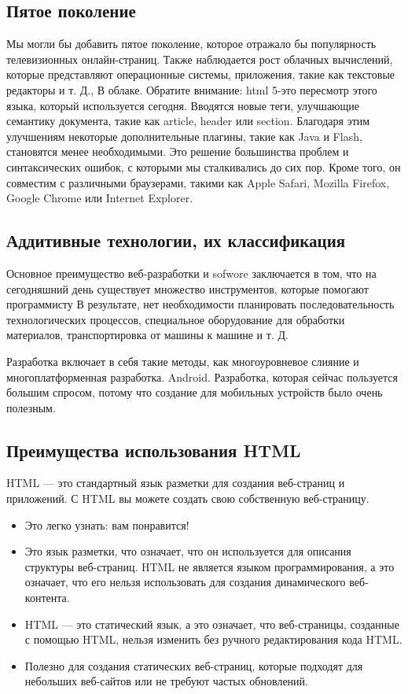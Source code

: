 \subsection{Пятое поколение}
Мы могли бы добавить пятое поколение, которое отражало бы популярность телевизионных онлайн-страниц. Также наблюдается рост облачных вычислений, которые представляют операционные системы, приложения, такие как текстовые редакторы и т. Д., В облаке. Обратите внимание: html 5-это пересмотр этого языка, который используется сегодня. Вводятся новые теги, улучшающие семантику документа, такие как article, header или section. Благодаря этим улучшениям некоторые дополнительные плагины, такие как Java и Flash, становятся менее необходимыми. Это решение большинства проблем и синтаксических ошибок, с которыми мы сталкивались до сих пор. Кроме того, он совместим с различными браузерами, такими как Apple Safari, Mozilla Firefox, Google Chrome или Internet Explorer.

\subsection{Аддитивные технологии, их классификация}

Основное преимущество веб-разработки и sofwore заключается в том, что на сегодняшний день существует множество инструментов, которые помогают программисту В результате, нет необходимости планировать последовательность технологических процессов, специальное оборудование для обработки материалов, транспортировка от машины к машине и т. Д.

Разработка включает в себя такие методы, как многоуровневое слияние и многоплатформенная разработка.
Android. Разработка, которая сейчас пользуется большим спросом, потому что создание для мобильных устройств было очень полезным.

\subsection{Преимущества использования HTML}
HTML — это стандартный язык разметки для создания веб-страниц и приложений. С HTML вы можете создать свою собственную веб-страницу.

\begin{itemize}
\item Это легко узнать: вам понравится!
\item Это язык разметки, что означает, что он используется для описания структуры веб-страниц. HTML не является языком программирования, а это означает, что его нельзя использовать для создания динамического веб-контента.
\item HTML — это статический язык, а это означает, что веб-страницы, созданные с помощью HTML, нельзя изменить без ручного редактирования кода HTML.
\item Полезно для создания статических веб-страниц, которые подходят для небольших веб-сайтов или не требуют частых обновлений.
\end{itemize}

